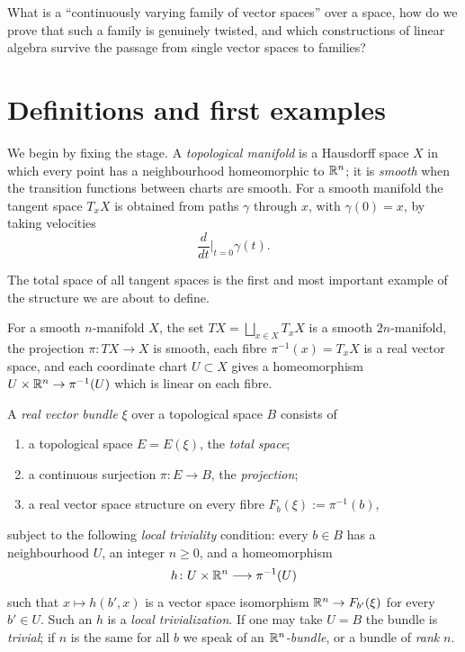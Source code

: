 \lecture

\begin{guiding}
What is a ``continuously varying family of vector spaces'' over a space, how do
we prove that such a family is genuinely twisted, and which constructions of
linear algebra survive the passage from single vector spaces to families?
\end{guiding}

\section{Definitions and first examples}

We begin by fixing the stage. A \emph{topological manifold} is a Hausdorff space
$X$ in which every point has a neighbourhood homeomorphic to $\mathbb{R}^n$; it is
\emph{smooth} when the transition functions between charts are smooth. For a
smooth manifold the tangent space $T_xX$ is obtained from paths $\gamma$ through
$x$, with $\gamma(0)=x$, by taking velocities
\[
\frac{d}{dt}\Big|_{t=0}\gamma(t).
\]

The total space of all tangent spaces is the first and most important example of
the structure we are about to define.

\begin{proposition}
For a smooth $n$-manifold $X$, the set $TX=\bigsqcup_{x\in X}T_xX$ is a smooth
$2n$-manifold, the projection $\pi\colon TX\to X$ is smooth, each fibre
$\pi^{-1}(x)=T_xX$ is a real vector space, and each coordinate chart
$U\subset X$ gives a homeomorphism $U\times\mathbb{R}^n\to\pi^{-1}(U)$ which is linear
on each fibre.
\end{proposition}

\begin{definition}
A \emph{real vector bundle} $\xi$ over a topological space $B$ consists of

\begin{enumerate}
\item a topological space $E=E(\xi)$, the \emph{total space};
\item a continuous surjection $\pi\colon E\to B$, the \emph{projection};
\item a real vector space structure on every fibre $F_b(\xi):=\pi^{-1}(b)$,
\end{enumerate}

subject to the following \emph{local triviality} condition: every $b\in B$ has a
neighbourhood $U$, an integer $n\ge0$, and a homeomorphism
\[
h\colon U\times\mathbb{R}^n\longrightarrow \pi^{-1}(U)
\]
such that $x\mapsto h(b',x)$ is a vector space isomorphism
$\mathbb{R}^n\to F_{b'}(\xi)$ for every $b'\in U$. Such an $h$ is a \emph{local
trivialization}. If one may take $U=B$ the bundle is \emph{trivial}; if $n$ is
the same for all $b$ we speak of an \emph{$\mathbb{R}^n$-bundle}, or a bundle of
\emph{rank} $n$.
\end{definition}

